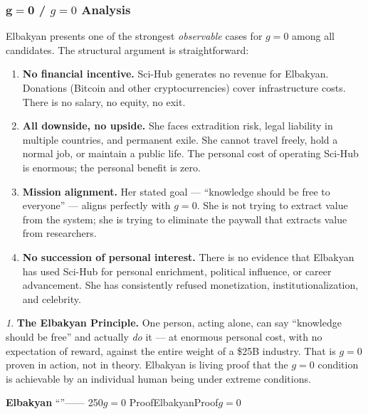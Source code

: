 \documentclass[12pt,a4paper]{article}
\theoremstyle{remark}
\newtheorem{govinsight}{}[section]
\newenvironment{govbox}{%
  \begin{center}
  \color{insightblue}
  \begin{minipage}{0.92\textwidth}
  \begin{govinsight}
}{%
  \end{govinsight}
  \end{minipage}
  \end{center}
}
\begin{document}
\subsubsection{$\mathbf{g=0}$  / $g=0$ Analysis}

Elbakyan presents one of the strongest \textit{observable} cases for $g=0$
among all candidates. The structural argument is straightforward:

\begin{enumerate}[leftmargin=*]
    \item \textbf{No financial incentive.} Sci-Hub generates no revenue for
          Elbakyan. Donations (Bitcoin and other cryptocurrencies) cover
          infrastructure costs. There is no salary, no equity, no exit.

    \item \textbf{All downside, no upside.} She faces extradition risk,
          legal liability in multiple countries, and permanent exile. She
          cannot travel freely, hold a normal job, or maintain a public life.
          The personal cost of operating Sci-Hub is enormous; the personal
          benefit is zero.

    \item \textbf{Mission alignment.} Her stated goal — ``knowledge should be
          free to everyone'' — aligns perfectly with $g=0$. She is not trying
          to extract value from the system; she is trying to eliminate the
          paywall that extracts value from researchers.

    \item \textbf{No succession of personal interest.} There is no evidence
          that Elbakyan has used Sci-Hub for personal enrichment, political
          influence, or career advancement. She has consistently refused
          monetization, institutionalization, and celebrity.
\end{enumerate}

\begin{govbox}
\textbf{The Elbakyan Principle.}
One person, acting alone, can say ``knowledge should be free'' and actually
\textit{do} it — at enormous personal cost, with no expectation of reward,
against the entire weight of a \$25B industry. That is $g=0$ proven in
action, not in theory. Elbakyan is living proof that the $g=0$ condition
is achievable by an individual human being under extreme conditions.

\textbf{Elbakyan}
“”\textit{}——
250$g=0$
ProofElbakyanProof$g=0$

\end{govbox}
\end{document}
